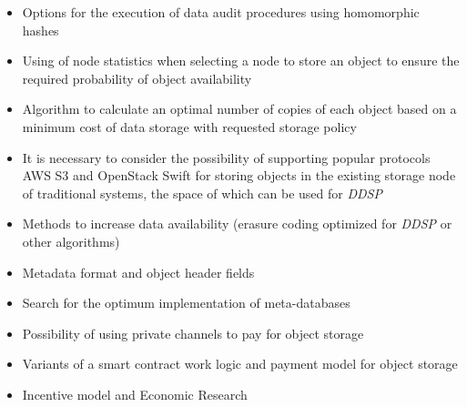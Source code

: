 \documentclass[a4paper, 11pt]{article}
\begin{document}
\begin{itemize}

    \item Options for the execution of data audit procedures using homomorphic
      hashes

    \item Using of node statistics when selecting a node to store an object to
      ensure the required probability of object availability

    \item Algorithm to calculate an optimal number of copies of each object
      based on a minimum cost of data storage with requested storage policy

    \item It is necessary to consider the possibility of supporting popular
      protocols AWS S3 and OpenStack Swift for storing objects in the existing
      storage node of traditional systems, the space of which can be used for
      \textit{DDSP}

    \item Methods to increase data availability (erasure coding optimized for
     \textit{DDSP} or other algorithms)

    \item Metadata format and object header fields

    \item Search for the optimum implementation of meta-databases

    \item Possibility of using private channels to pay for object storage

    \item Variants of a smart contract work logic and payment model for object
      storage

    \item Incentive model and Economic Research

\end{itemize}


\hspace*{-3.4cm}
\end{document}
